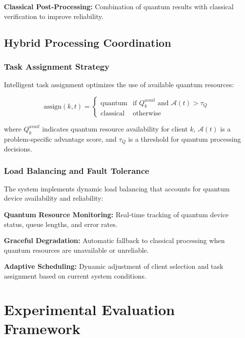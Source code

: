 \documentclass[10pt,journal,compsoc]{IEEEtran}
\begin{document}
\textbf{Classical Post-Processing:} Combination of quantum results with classical verification to improve reliability.

\subsection{Hybrid Processing Coordination}

\subsubsection{Task Assignment Strategy}

Intelligent task assignment optimizes the use of available quantum resources:

\begin{equation}
\text{assign}(k, t) = \begin{cases}
\text{quantum} & \text{if } Q_k^{avail} \text{ and } \mathcal{A}(t) > \tau_Q \\
\text{classical} & \text{otherwise}
\end{cases}
\label{eq:task_assignment}
\end{equation}

where $Q_k^{avail}$ indicates quantum resource availability for client $k$, $\mathcal{A}(t)$ is a problem-specific advantage score, and $\tau_Q$ is a threshold for quantum processing decisions.

\subsubsection{Load Balancing and Fault Tolerance}

The system implements dynamic load balancing that accounts for quantum device availability and reliability:

\textbf{Quantum Resource Monitoring:} Real-time tracking of quantum device status, queue lengths, and error rates.

\textbf{Graceful Degradation:} Automatic fallback to classical processing when quantum resources are unavailable or unreliable.

\textbf{Adaptive Scheduling:} Dynamic adjustment of client selection and task assignment based on current system conditions.

\section{Experimental Evaluation Framework}
\end{document}

